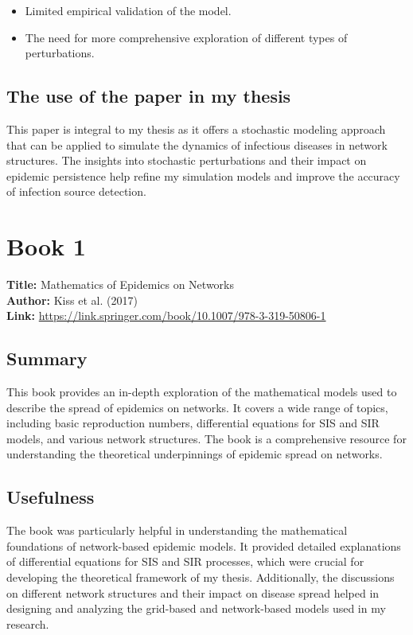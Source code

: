 \begin{itemize}
    \item Limited empirical validation of the model.
    \item The need for more comprehensive exploration of different types of perturbations.
\end{itemize}

\subsection{The use of the paper in my thesis}

This paper is integral to my thesis as it offers a stochastic modeling approach that can be applied to simulate the dynamics of infectious diseases in network structures. The insights into stochastic perturbations and their impact on epidemic persistence help refine my simulation models and improve the accuracy of infection source detection.

\section{Book 1}
\textbf{Title:} Mathematics of Epidemics on Networks \\
\textbf{Author:} Kiss et al. (2017) \\
\textbf{Link:} \url{https://link.springer.com/book/10.1007/978-3-319-50806-1}

\subsection{Summary}

This book provides an in-depth exploration of the mathematical models used to describe the spread of epidemics on networks. It covers a wide range of topics, including basic reproduction numbers, differential equations for SIS and SIR models, and various network structures. The book is a comprehensive resource for understanding the theoretical underpinnings of epidemic spread on networks.

\subsection{Usefulness}

The book was particularly helpful in understanding the mathematical foundations of network-based epidemic models. It provided detailed explanations of differential equations for SIS and SIR processes, which were crucial for developing the theoretical framework of my thesis. Additionally, the discussions on different network structures and their impact on disease spread helped in designing and analyzing the grid-based and network-based models used in my research.

